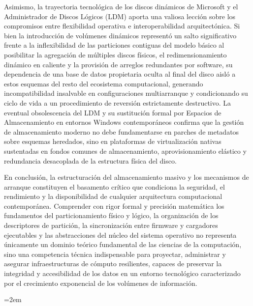\documentclass[12pt]{article}
\begin{document}
Asimismo, la trayectoria tecnológica de los discos dinámicos de Microsoft y el Administrador de Discos Lógicos (LDM) aporta una valiosa lección sobre los compromisos entre flexibilidad operativa e interoperabilidad arquitectónica. Si bien la introducción de volúmenes dinámicos representó un salto significativo frente a la inflexibilidad de las particiones contiguas del modelo básico al posibilitar la agregación de múltiples discos físicos, el redimensionamiento dinámico en caliente y la provisión de arreglos redundantes por software, su dependencia de una base de datos propietaria oculta al final del disco aisló a estos esquemas del resto del ecosistema computacional, generando incompatibilidad insalvable en configuraciones multiarranque y condicionando su ciclo de vida a un procedimiento de reversión estrictamente destructivo. La eventual obsolescencia del LDM y su sustitución formal por Espacios de Almacenamiento en entornos Windows contemporáneos confirma que la gestión de almacenamiento moderno no debe fundamentarse en parches de metadatos sobre esquemas heredados, sino en plataformas de virtualización nativas sustentadas en fondos comunes de almacenamiento, aprovisionamiento elástico y redundancia desacoplada de la estructura física del disco.

En conclusión, la estructuración del almacenamiento masivo y los mecanismos de arranque constituyen el basamento crítico que condiciona la seguridad, el rendimiento y la disponibilidad de cualquier arquitectura computacional contemporánea. Comprender con rigor formal y precisión matemática los fundamentos del particionamiento físico y lógico, la organización de los descriptores de partición, la sincronización entre firmware y cargadores ejecutables y las abstracciones del núcleo del sistema operativo no representa únicamente un dominio teórico fundamental de las ciencias de la computación, sino una competencia técnica indispensable para proyectar, administrar y asegurar infraestructuras de cómputo resilientes, capaces de preservar la integridad y accesibilidad de los datos en un entorno tecnológico caracterizado por el crecimiento exponencial de los volúmenes de información.

\nocite{*}
\emergencystretch=2em
\printbibliography[heading=bibintoc, title={Referencias}]
\end{document}
